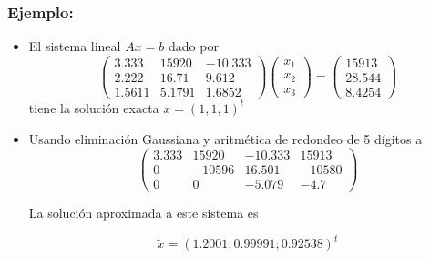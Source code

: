 \documentclass{beamer}
\begin{document}
  \begin{frame}
    \frametitle{Ejemplo:}
    \begin{itemize}
      \item<1->El sistema lineal $A x = b$ dado por
      $$
      \left(\begin{array}{ccc}
          3.333 & 15920 & -10.333\\
          2.222 & 16.71 & 9.612\\
          1.5611 & 5.1791 & 1.6852
        \end{array}\right)\left(\begin{array}{c}
        x_1\\
        x_2\\
        x_3
        \end{array}\right)=\left(\begin{array}{c}
        15913\\
        28.544\\
        8.4254
        \end{array}\right)
      $$      
      tiene la soluci\'on exacta $x = (1, 1, 1)^t$
      \item<2-> Usando eliminaci\'on Gaussiana y aritm\'etica de redondeo de 5 d\'igitos a
      $$
      \left(\begin{array}{ccc|c}
             3.333 & 15920 & -10.333 & 15913\\
             0 & -10596 & 16.501 &-10580\\
             0 & 0 & -5.079 & -4.7
            \end{array}\right)
      $$
      
      La soluci\'on aproximada a este sistema es
      
      $$
      \tilde x = (1.2001; 0.99991; 0.92538)^t
      $$
      \end{itemize}
\end{frame}
\end{document}
